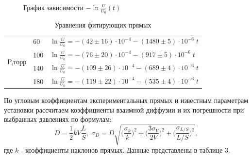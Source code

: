 \documentclass[a4paper,12pt]{article}
\begin{document}
\begin{enumerate}
\begin{center}
\begin{figure}[h!]
\caption{График зависимости $-\ln{\frac{U}{U_0}}(t)$}
\end{figure}
\end{center}
\begin{center}
\begin{table}[h!]
\caption{Уравнения фитирующих прямых}
	\begin{tabular}{@{}|l|l|l|l|l|l|@{}}
		\toprule
		\multirow{4}{*}{P,торр} & 60  & \multicolumn{4}{l|}{$\ln{\frac{U}{U_0}} =-(42 \pm 16)\cdot 10^{-4} -(1480 \pm 5)\cdot 10^{-6} \;t$} \\ \cmidrule(l){2-6} 
		& 100 & \multicolumn{4}{l|}{$\ln{\frac{U}{U_0}} =-(76 \pm 20)\cdot 10^{-4} -(917 \pm 5)\cdot 10^{-6} \; t$} \\ \cmidrule(l){2-6} 
		& 140 & \multicolumn{4}{l|}{$\ln{\frac{U}{U_0}} =-(109 \pm 26)\cdot 10^{-4} -(689 \pm 4)\cdot 10^{-6} \;t$} \\ \cmidrule(l){2-6} 
		& 180 & \multicolumn{4}{l|}{$\ln{\frac{U}{U_0}} =-(119 \pm 22)\cdot 10^{-4} -(535 \pm 4)\cdot 10^{-6} \; t$} \\ \bottomrule
	\end{tabular}
\end{table}
\end{center}
По угловым коэффициентам экспериментальных прямых и известным параметрам установки рассчитаем коэффициенты взаимной диффузии и их погрешности при выбранных давлениях по формулам: $$D =  \frac{1}{2} kV \frac{L}{S}, \; \sigma_D = D \sqrt{\big(\frac{\sigma_k}{k}\big)^2 + \big(\frac{3\sigma_V }{2V}\big)^2 + \big(\frac{\sigma_{L/S}}{L/S}\big)^2},$$ где $k$ - коэффициенты наклонов прямых. Данные представлены в таблице 3.
 

\end{enumerate}
\end{document}

